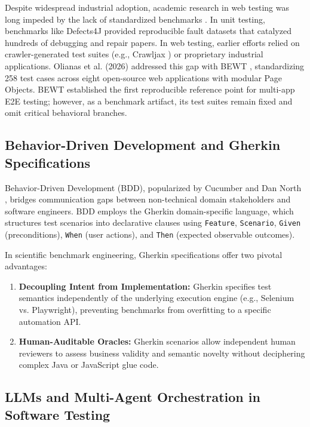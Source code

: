 \documentclass[pdflatex,sn-mathphys-num]{sn-jnl}
\begin{document}
Despite widespread industrial adoption, academic research in web testing was long impeded by the lack of standardized benchmarks \cite{sim2003benchmark}. In unit testing, benchmarks like Defects4J provided reproducible fault datasets that catalyzed hundreds of debugging and repair papers. In web testing, earlier efforts relied on crawler-generated test suites (e.g., Crawljax \cite{mesbah2012crawljax}) or proprietary industrial applications. Olianas et al. (2026) addressed this gap with BEWT \cite{olianas2026bewt}, standardizing 258 test cases across eight open-source web applications with modular Page Objects. BEWT established the first reproducible reference point for multi-app E2E testing; however, as a benchmark artifact, its test suites remain fixed and omit critical behavioral branches.

\subsection{Behavior-Driven Development and Gherkin Specifications}

Behavior-Driven Development (BDD), popularized by Cucumber and Dan North \cite{wynne2017cucumber}, bridges communication gaps between non-technical domain stakeholders and software engineers. BDD employs the Gherkin domain-specific language, which structures test scenarios into declarative clauses using \texttt{Feature}, \texttt{Scenario}, \texttt{Given} (preconditions), \texttt{When} (user actions), and \texttt{Then} (expected observable outcomes). 

In scientific benchmark engineering, Gherkin specifications offer two pivotal advantages:
\begin{enumerate}
    \item \textbf{Decoupling Intent from Implementation:} Gherkin specifies test semantics independently of the underlying execution engine (e.g., Selenium vs. Playwright), preventing benchmarks from overfitting to a specific automation API.
    \item \textbf{Human-Auditable Oracles:} Gherkin scenarios allow independent human reviewers to assess business validity and semantic novelty without deciphering complex Java or JavaScript glue code.
\end{enumerate}

\subsection{LLMs and Multi-Agent Orchestration in Software Testing}
\end{document}
